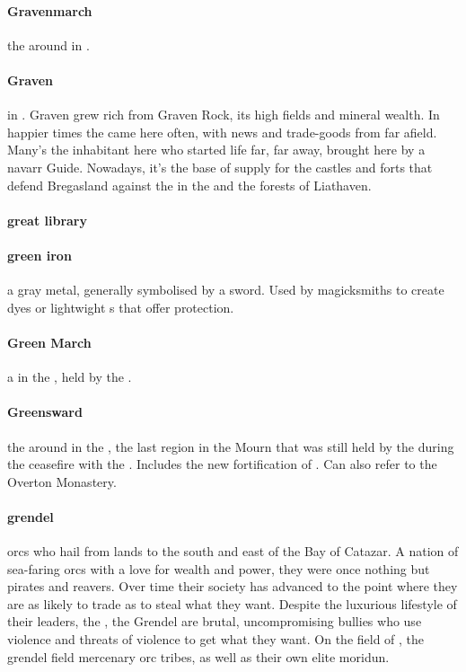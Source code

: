 \paragraph{Gravenmarch} the  around  in .
\paragraph{Graven}  in . Graven grew rich from Graven Rock, its high fields and mineral wealth. In happier times the  came here often, with news and trade-goods from far afield. Many's the inhabitant here who started life far, far away, brought here by a navarr Guide. Nowadays, it’s the base of supply for the castles and forts that defend Bregasland against the  in the  and the forests of Liathaven.
\paragraph{great library} 
\paragraph{green iron} a gray metal, generally symbolised by a sword. Used by magicksmiths to create dyes or lightwight s that offer protection.
\paragraph{Green March} a  in the , held by the .
\paragraph{Greensward} the  around  in the , the last region in the Mourn that was still held by the  during the ceasefire with the . Includes the new fortification of . Can also refer to the Overton Monastery.
\paragraph{grendel} orcs who hail from lands to the south and east of the Bay of Catazar. A nation of sea-faring orcs with a love for wealth and power, they were once nothing but pirates and reavers. Over time their society has advanced to the point where they are as likely to trade as to steal what they want. Despite the luxurious lifestyle of their leaders, the , the Grendel are brutal, uncompromising bullies who use violence and threats of violence to get what they want. On the field of , the grendel field mercenary orc tribes, as well as their own elite moridun.
